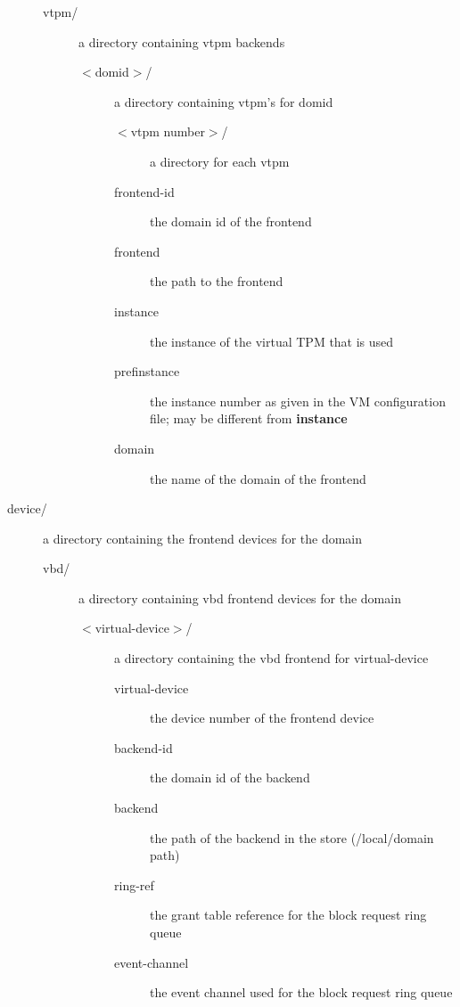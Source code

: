 \documentclass[11pt,twoside,final,openright]{report}
\begin{document}
\begin{description}
\begin{description}
  \item[vtpm/] a directory containing vtpm backends
    \begin{description}
    \item[$<$domid$>$/] a directory containing vtpm's for domid
      \begin{description}
      \item[$<$vtpm number$>$/] a directory for each vtpm
      \item[frontend-id] the domain id of the frontend
      \item[frontend] the path to the frontend
      \item[instance] the instance of the virtual TPM that is used
      \item[pref{\textunderscore}instance] the instance number as given in the VM configuration file;
           may be different from {\bf instance}
      \item[domain] the name of the domain of the frontend
      \end{description}
    \end{description}

  \end{description}

  \item[device/] a directory containing the frontend devices for the
    domain
    \begin{description}
    \item[vbd/] a directory containing vbd frontend devices for the
      domain
      \begin{description}
      \item[$<$virtual-device$>$/] a directory containing the vbd frontend for
	virtual-device
	\begin{description}
	\item[virtual-device] the device number of the frontend device
	\item[backend-id] the domain id of the backend
	\item[backend] the path of the backend in the store (/local/domain
	  path)
	\item[ring-ref] the grant table reference for the block request
	  ring queue
	\item[event-channel] the event channel used for the block request
	  ring queue
	\end{description}
	

\end{description}
\end{description}
\end{description}
\end{document}
